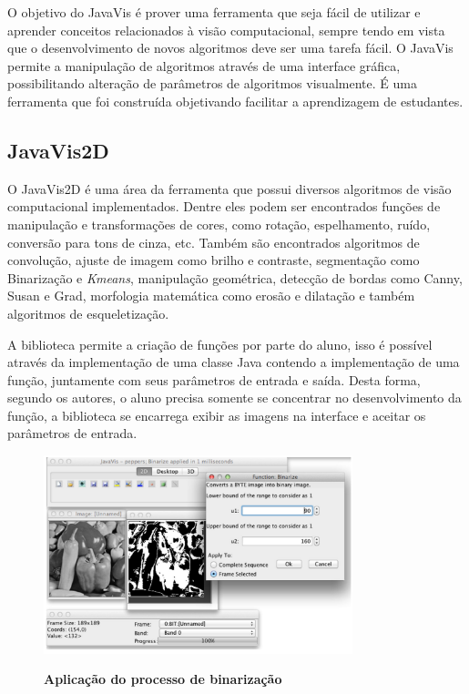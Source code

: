 \documentclass[
	12pt,				%
	oneside,			%
	a4paper,			%
	english,			%
	french,				%
	spanish,			%
	brazil,				%
	]{abntex2}
\begin{document}
O objetivo do JavaVis é prover uma ferramenta que seja fácil de utilizar e aprender conceitos relacionados à visão computacional, sempre tendo em vista que o desenvolvimento de novos algoritmos deve ser uma tarefa fácil. O JavaVis permite a manipulação de algoritmos através de uma interface gráfica, possibilitando alteração de parâmetros de algoritmos visualmente. É uma ferramenta que foi construída objetivando facilitar a aprendizagem de estudantes.

\subsection{JavaVis2D}

O JavaVis2D é uma área da ferramenta que possui diversos algoritmos de visão computacional implementados. Dentre eles podem ser encontrados funções de manipulação e transformações de cores, como rotação, espelhamento, ruído, conversão para tons de cinza, etc. Também são encontrados algoritmos de convolução, ajuste de imagem como brilho e contraste, segmentação como Binarização e \textit{Kmeans}, manipulação geométrica, detecção de bordas como Canny, Susan e Grad, morfologia matemática como erosão e dilatação e também algoritmos de esqueletização. 

A biblioteca permite a criação de funções por parte do aluno, isso é possível através da implementação de uma classe Java contendo a implementação de uma função, juntamente com seus parâmetros de entrada e saída. Desta forma, segundo os autores, o aluno precisa somente se concentrar no desenvolvimento da função, a biblioteca se encarrega exibir as imagens na interface e aceitar os parâmetros de entrada.

\begin{figure}[ht]
\centering
\caption{\textbf{Aplicação do processo de binarização }}
\includegraphics[width=0.8\textwidth]{imagens/javavis_2d.png}
\label{fig:javavis_2d}
\end{figure}
\end{document}
